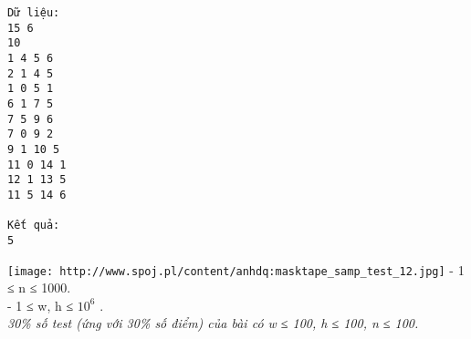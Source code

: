 \begin{verbatim}
Dữ liệu:
15 6
10
1 4 5 6
2 1 4 5
1 0 5 1
6 1 7 5
7 5 9 6
7 0 9 2
9 1 10 5
11 0 14 1
12 1 13 5
11 5 14 6

Kết quả:
5
\end{verbatim}
\texttt{[image: http://www.spoj.pl/content/anhdq:masktape\_samp\_test\_12.jpg]}
- 1 ≤ n ≤ 1000.   
\\   - 1 ≤ w, h ≤ $10^{6}$   .   
\\\textit{     30\% số test (ứng với 30\% số điểm) của bài có  w ≤ 100, h ≤ 100, n ≤ 100.    }
